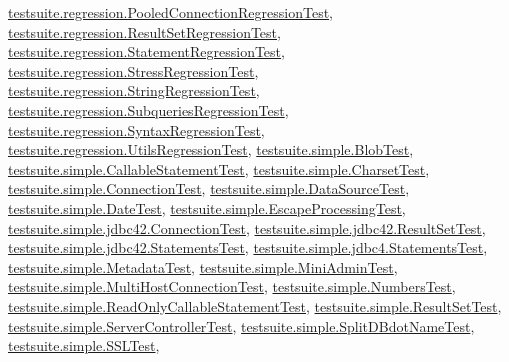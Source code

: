 \mbox{\hyperlink{classtestsuite_1_1regression_1_1_pooled_connection_regression_test}{testsuite.\+regression.\+Pooled\+Connection\+Regression\+Test}}, \mbox{\hyperlink{classtestsuite_1_1regression_1_1_result_set_regression_test}{testsuite.\+regression.\+Result\+Set\+Regression\+Test}}, \mbox{\hyperlink{classtestsuite_1_1regression_1_1_statement_regression_test}{testsuite.\+regression.\+Statement\+Regression\+Test}}, \mbox{\hyperlink{classtestsuite_1_1regression_1_1_stress_regression_test}{testsuite.\+regression.\+Stress\+Regression\+Test}}, \mbox{\hyperlink{classtestsuite_1_1regression_1_1_string_regression_test}{testsuite.\+regression.\+String\+Regression\+Test}}, \mbox{\hyperlink{classtestsuite_1_1regression_1_1_subqueries_regression_test}{testsuite.\+regression.\+Subqueries\+Regression\+Test}}, \mbox{\hyperlink{classtestsuite_1_1regression_1_1_syntax_regression_test}{testsuite.\+regression.\+Syntax\+Regression\+Test}}, \mbox{\hyperlink{classtestsuite_1_1regression_1_1_utils_regression_test}{testsuite.\+regression.\+Utils\+Regression\+Test}}, \mbox{\hyperlink{classtestsuite_1_1simple_1_1_blob_test}{testsuite.\+simple.\+Blob\+Test}}, \mbox{\hyperlink{classtestsuite_1_1simple_1_1_callable_statement_test}{testsuite.\+simple.\+Callable\+Statement\+Test}}, \mbox{\hyperlink{classtestsuite_1_1simple_1_1_charset_test}{testsuite.\+simple.\+Charset\+Test}}, \mbox{\hyperlink{classtestsuite_1_1simple_1_1_connection_test}{testsuite.\+simple.\+Connection\+Test}}, \mbox{\hyperlink{classtestsuite_1_1simple_1_1_data_source_test}{testsuite.\+simple.\+Data\+Source\+Test}}, \mbox{\hyperlink{classtestsuite_1_1simple_1_1_date_test}{testsuite.\+simple.\+Date\+Test}}, \mbox{\hyperlink{classtestsuite_1_1simple_1_1_escape_processing_test}{testsuite.\+simple.\+Escape\+Processing\+Test}}, \mbox{\hyperlink{classtestsuite_1_1simple_1_1jdbc42_1_1_connection_test}{testsuite.\+simple.\+jdbc42.\+Connection\+Test}}, \mbox{\hyperlink{classtestsuite_1_1simple_1_1jdbc42_1_1_result_set_test}{testsuite.\+simple.\+jdbc42.\+Result\+Set\+Test}}, \mbox{\hyperlink{classtestsuite_1_1simple_1_1jdbc42_1_1_statements_test}{testsuite.\+simple.\+jdbc42.\+Statements\+Test}}, \mbox{\hyperlink{classtestsuite_1_1simple_1_1jdbc4_1_1_statements_test}{testsuite.\+simple.\+jdbc4.\+Statements\+Test}}, \mbox{\hyperlink{classtestsuite_1_1simple_1_1_metadata_test}{testsuite.\+simple.\+Metadata\+Test}}, \mbox{\hyperlink{classtestsuite_1_1simple_1_1_mini_admin_test}{testsuite.\+simple.\+Mini\+Admin\+Test}}, \mbox{\hyperlink{classtestsuite_1_1simple_1_1_multi_host_connection_test}{testsuite.\+simple.\+Multi\+Host\+Connection\+Test}}, \mbox{\hyperlink{classtestsuite_1_1simple_1_1_numbers_test}{testsuite.\+simple.\+Numbers\+Test}}, \mbox{\hyperlink{classtestsuite_1_1simple_1_1_read_only_callable_statement_test}{testsuite.\+simple.\+Read\+Only\+Callable\+Statement\+Test}}, \mbox{\hyperlink{classtestsuite_1_1simple_1_1_result_set_test}{testsuite.\+simple.\+Result\+Set\+Test}}, \mbox{\hyperlink{classtestsuite_1_1simple_1_1_server_controller_test}{testsuite.\+simple.\+Server\+Controller\+Test}}, \mbox{\hyperlink{classtestsuite_1_1simple_1_1_split_d_bdot_name_test}{testsuite.\+simple.\+Split\+D\+Bdot\+Name\+Test}}, \mbox{\hyperlink{classtestsuite_1_1simple_1_1_s_s_l_test}{testsuite.\+simple.\+S\+S\+L\+Test}}, 